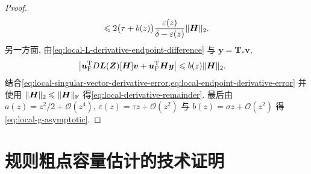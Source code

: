 \documentclass{ctexart}
\newcommand{\T}{\mathrm{T}}
\renewcommand{\O}{\mathcal{O}}
\newcommand{\dt}{\delta}
\renewcommand{\le}{\leqslant}
\DeclarePairedDelimiter\norm{\lVert}{\rVert}
\DeclarePairedDelimiter\abs{\lvert}{\rvert}
\begin{document}
\begin{proof}
\begin{align}
     \le2\bigl(\tau+b(z)\bigr)
       \frac{\varepsilon(z)}{\dt-\varepsilon(z)}
       \norm{\bm H}_2.
    \label{eq:local-singular-vector-derivative-error}
\end{align}
另一方面, 由\cref{eq:local-L-derivative-endpoint-difference} 与 $\bm y=\bm T_\ast\bm v$,
\begin{align}
    \abs*{
      \bm u_{\mathrm F}^\T D\bm L(\bm Z)[\bm H]\bm v
      +\bm u_{\mathrm F}^\T\bm H\bm y}
    &\le b(z)\norm{\bm H}_2.
    \label{eq:local-endpoint-derivative-error}
\end{align}
结合\cref{eq:local-singular-vector-derivative-error,eq:local-endpoint-derivative-error} 并使用 $\norm{\bm H}_2\le\norm{\bm H}_{\mathrm F}$ 得\cref{eq:local-derivative-remainder}. 最后由
$a(z)=z^2/2+\O(z^4)$, $\varepsilon(z)=\tau z+\O(z^2)$ 与
$b(z)=\sigma z+\O(z^2)$ 得\cref{eq:local-g-asymptotic}.
\end{proof}

\section{规则粗点容量估计的技术证明}
\label{app:capacity-proofs}
\end{document}
